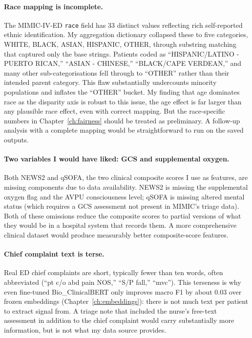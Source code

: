 \paragraph{Race mapping is incomplete.} The MIMIC-IV-ED \texttt{race} field has 33 distinct values reflecting rich self-reported ethnic identification. My aggregation dictionary collapsed these to five categories, WHITE, BLACK, ASIAN, HISPANIC, OTHER, through substring matching that captured only the base strings. Patients coded as ``HISPANIC/LATINO - PUERTO RICAN,'' ``ASIAN - CHINESE,'' ``BLACK/CAPE VERDEAN,'' and many other sub-categorisations fell through to ``OTHER'' rather than their intended parent category. This flaw substantially undercounts minority populations and inflates the ``OTHER'' bucket. My finding that age dominates race as the disparity axis is robust to this issue, the age effect is far larger than any plausible race effect, even with correct mapping. But the race-specific numbers in Chapter~\ref{ch:fairness} should be treated as preliminary. A follow-up analysis with a complete mapping would be straightforward to run on the saved outputs.

\paragraph{Two variables I would have liked: GCS and supplemental oxygen.} Both NEWS2 and qSOFA, the two clinical composite scores I use as features, are missing components due to data availability. NEWS2 is missing the supplemental oxygen flag and the AVPU consciousness level; qSOFA is missing altered mental status (which requires a GCS assessment not present in MIMIC's triage data). Both of these omissions reduce the composite scores to partial versions of what they would be in a hospital system that records them. A more comprehensive clinical dataset would produce measurably better composite-score features.

\paragraph{Chief complaint text is terse.} Real ED chief complaints are short, typically fewer than ten words, often abbreviated (``pt c/o abd pain NOS,'' ``S/P fall,'' ``mvc''). This terseness is why even fine-tuned Bio\_ClinicalBERT only improves macro F1 by about $0.03$ over frozen embeddings (Chapter~\ref{ch:embeddings}): there is not much text per patient to extract signal from. A triage note that included the nurse's free-text assessment in addition to the chief complaint would carry substantially more information, but is not what my data source provides.

